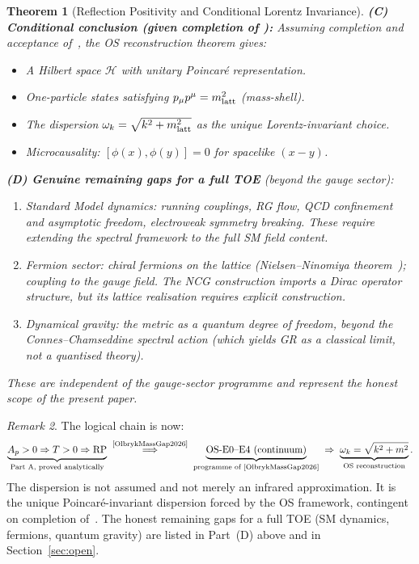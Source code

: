 \documentclass[12pt]{article}
\newtheorem{theorem}{Theorem}[section]
\theoremstyle{definition}
\theoremstyle{remark}
\newtheorem{remark}[theorem]{Remark}
\begin{document}
\begin{theorem}[Reflection Positivity and Conditional Lorentz Invariance]
\textbf{(C) Conditional conclusion (given completion of \cite{OlbrykMassGap2026}):}
Assuming completion and acceptance of~\cite{OlbrykMassGap2026},
the OS reconstruction theorem
\cite{OsterwalderSchrader1973,OsterwalderSchrader1975}
gives:
\begin{itemize}
\item A Hilbert space $\mathcal{H}$ with unitary Poincar\'e representation.
\item One-particle states satisfying $p_\mu p^\mu = m_{\rm latt}^2$ (mass-shell).
\item The dispersion $\omega_k = \sqrt{k^2 + m_{\rm latt}^2}$
      as the \emph{unique Lorentz-invariant} choice.
\item Microcausality: $[\phi(x),\phi(y)] = 0$ for spacelike $(x-y)$.
\end{itemize}

\textbf{(D) Genuine remaining gaps for a full TOE} (beyond the gauge sector):
\begin{enumerate}
\item \emph{Standard Model dynamics}: running couplings, RG flow,
      QCD confinement and asymptotic freedom, electroweak symmetry breaking.
      These require extending the spectral framework to the full SM field content.
\item \emph{Fermion sector}: chiral fermions on the lattice (Nielsen--Ninomiya
      theorem~\cite{NielsenNinomiya1981}); coupling to the gauge field.
      The NCG construction imports a Dirac operator structure, but its
      lattice realisation requires explicit construction.
\item \emph{Dynamical gravity}: the metric as a quantum degree of freedom,
      beyond the Connes--Chamseddine spectral action (which yields GR as a
      classical limit, not a quantised theory).
\end{enumerate}
These are independent of the gauge-sector programme and represent the
honest scope of the present paper.
\end{theorem}

\begin{remark}
The logical chain is now:
\[
\underbrace{A_p > 0 \Rightarrow T > 0 \Rightarrow \text{RP}}_{\text{Part A, proved analytically}}
\;\overset{\text{\cite{OlbrykMassGap2026}}}{\Longrightarrow}\;
\underbrace{\text{OS-E0--E4 (continuum)}}_{\text{programme of \cite{OlbrykMassGap2026}}}
\;\Rightarrow\;
\underbrace{\omega_k = \sqrt{k^2+m^2}}_{\text{OS reconstruction}}.
\]
The dispersion is not assumed and not merely an infrared approximation.
It is the unique Poincar\'e-invariant dispersion forced by the OS framework,
contingent on completion of~\cite{OlbrykMassGap2026}.
The honest remaining gaps for a full TOE (SM dynamics, fermions,
quantum gravity) are listed in Part~(D) above and in
Section~\ref{sec:open}.
\end{remark}
\end{document}
